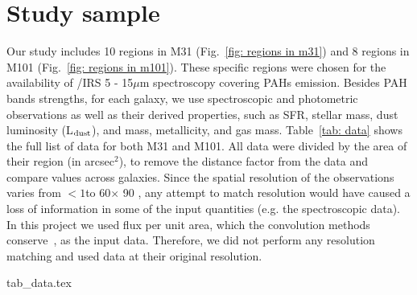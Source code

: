 
\section{Study sample} %
\label{Sec: data_SOMN}

Our study includes 10 regions in M31 (Fig.~\ref{fig: regions in m31}) and 8 regions in M101 (Fig.~\ref{fig: regions in m101}). 
These specific regions were chosen for the availability of \Spitzer/IRS 5 - 15$\mu$m  spectroscopy covering PAHs emission.
Besides PAH bands strengths, for each galaxy, we use spectroscopic and photometric observations as well as their derived properties, such as SFR, stellar mass, dust luminosity (L$_{\rm dust}$), and mass, metallicity, and gas mass.
Table~\ref{tab: data} shows the full list of data for both M31 and M101.
All data were divided by the area of their region (in arcsec$^2$), to remove the distance factor from the data and compare values across galaxies.
Since the spatial resolution of the observations varies from $<1$\arcsec to 60\arcsec $\times$ 90 \arcsec, any attempt to match resolution would have caused a loss of information in some of the input quantities (e.g. the spectroscopic data).
In this project we used flux per unit area, which the convolution methods conserve~\citep{Aniano12}, as the input data.
Therefore, we did not perform any resolution matching and used data at their original resolution. %


{tab_data.tex}

